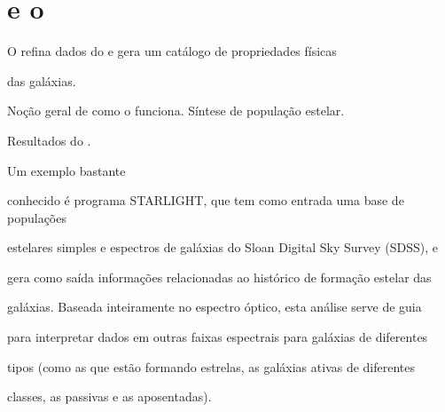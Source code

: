 
\section{\starlight e o \SDSS}
\label{sec:Intro:Starlight}




O \starlight refina dados do \SDSS e gera um catálogo de propriedades físicas

das galáxias.



Noção geral de como o \starlight funciona. Síntese de população estelar.



Resultados do \starlight.





Um exemplo bastante

conhecido é programa STARLIGHT, que tem como entrada uma base de populações

estelares simples e espectros de galáxias do Sloan Digital Sky Survey (SDSS), e

gera como saída informações relacionadas ao histórico de formação estelar das

galáxias. Baseada inteiramente no espectro óptico, esta análise serve de guia

para interpretar dados em outras faixas espectrais para galáxias de diferentes

tipos (como as que estão formando estrelas, as galáxias ativas de diferentes

classes, as passivas e as aposentadas).



